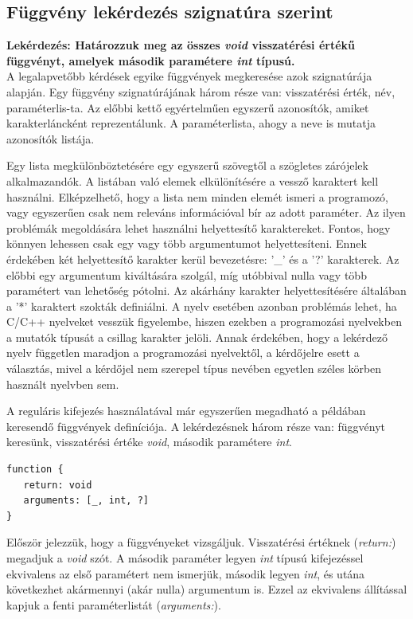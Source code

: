 \documentclass[a4paper,12pt]{report}
\begin{document}
\subsection{Függvény lekérdezés szignatúra szerint}
\textbf{Lekérdezés: Határozzuk meg az összes \textit{void} visszatérési értékű függvényt, amelyek második paramétere \textit{int} típusú.}
\\
A legalapvetőbb kérdések egyike függvények megkeresése azok szignatúrája alapján. Egy függvény szignatúrájának három része van: visszatérési érték, név, paraméterlis-ta. Az előbbi kettő egyértelműen egyszerű azonosítók, amiket karakterláncként reprezentálunk. A paraméterlista, ahogy a neve is mutatja azonosítók listája.
\par Egy lista megkülönböztetésére egy egyszerű szövegtől a szögletes zárójelek alkalmazandók. A listában való elemek elkülönítésére a vessző karaktert kell használni. Elképzelhető, hogy a lista nem minden elemét ismeri a programozó, vagy egyszerűen csak nem releváns információval bír az adott paraméter. Az ilyen problémák megoldására lehet használni helyettesítő karaktereket. Fontos, hogy könnyen lehessen csak egy vagy több argumentumot helyettesíteni. Ennek érdekében két helyettesítő karakter kerül bevezetésre: '\_' és a '?' karakterek. Az előbbi egy argumentum kiváltására szolgál, míg utóbbival nulla vagy több paramétert van lehetőség pótolni. Az akárhány karakter helyettesítésére általában a '*' karaktert szokták definiálni. A nyelv esetében azonban problémás lehet, ha C/C++ nyelveket vesszük figyelembe, hiszen ezekben a programozási nyelvekben a mutatók típusát a csillag karakter jelöli. Annak érdekében, hogy a lekérdező nyelv független maradjon a programozási nyelvektől, a kérdőjelre esett a választás, mivel a kérdőjel nem szerepel típus nevében egyetlen széles körben használt nyelvben sem.
\par A reguláris kifejezés használatával már egyszerűen megadható a példában keresendő függvények definíciója. A lekérdezésnek három része van: függvényt keresünk, visszatérési értéke \textit{void}, második paramétere \textit{int}.
\begin{verbatim}
function {
   return: void
   arguments: [_, int, ?]
}
\end{verbatim}
\par Először jelezzük, hogy a függvényeket vizsgáljuk. Visszatérési értéknek (\textit{return:}) megadjuk a \textit{void} szót. A második paraméter legyen \textit{int} típusú kifejezéssel ekvivalens az első paramétert nem ismerjük, második legyen \textit{int}, és utána következhet akármennyi (akár nulla) argumentum is. Ezzel az ekvivalens állítással kapjuk a fenti paraméterlistát (\textit{arguments:}).
\end{document}

